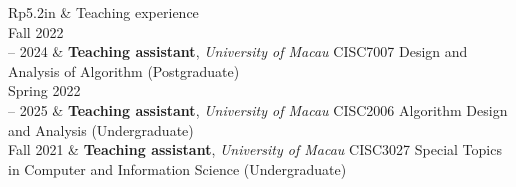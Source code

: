 \documentclass[letterpaper, 11pt]{article}
\newcommand{\headingfont}{\Large\color{OliveGreen}}
\newenvironment{SectionTable}[1]{
	\renewcommand*{\arraystretch}{1.2}
	\setlength{\tabcolsep}{10pt}
	\begin{longtable}{Rp{5.2in}} & #1 \\}
{\end{longtable}\vspace{-1cm}}
\begin{document}
\begin{SectionTable}{\headingfont Teaching experience}
Fall 2022 \\-- 2024 & 
\textbf{Teaching assistant}, \textit{University of Macau}\newline
CISC7007 Design and Analysis of Algorithm (Postgraduate) \\

Spring 2022 \\-- 2025 & 
\textbf{Teaching assistant}, \textit{University of Macau}\newline
CISC2006 Algorithm Design and Analysis (Undergraduate) \\

Fall 2021 & 
\textbf{Teaching assistant}, \textit{University of Macau}\newline
CISC3027 Special Topics in Computer and Information Science (Undergraduate) \\
\end{SectionTable}





\end{document}

